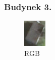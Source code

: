 \documentclass[a4paper,12pt]{article}  %
\begin{document}
\subsubsection{Budynek 3.}
\begin{figure}[H]
    \centering
    \begin{minipage}{0.24\textwidth}
        \centering
        \includegraphics[width=\linewidth]{spektralne/rgb_budynek3.png}
        \caption*{RGB}
    \end{minipage}
    \begin{minipage}{0.24\textwidth}
        \centering

\end{minipage}
\end{figure}
\end{document}
